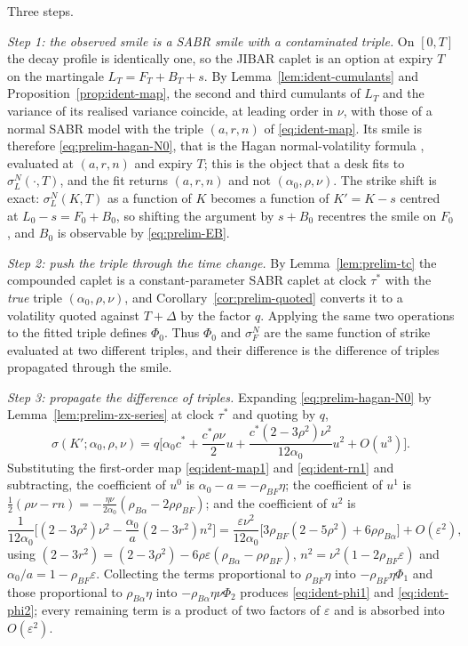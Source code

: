 \documentclass[../../../main.tex]{subfiles}
\begin{document}
\begin{route}
Three steps.

\emph{Step 1: the observed smile is a SABR smile with a contaminated triple.} On $[0,T]$ the decay profile is identically one, so the JIBAR caplet is an option at expiry $T$ on the martingale $L_T=F_T+B_T+s$. By Lemma~\ref{lem:ident-cumulants} and Proposition~\ref{prop:ident-map}, the second and third cumulants of $L_T$ and the variance of its realised variance coincide, at leading order in $\nu$, with those of a normal SABR model with the triple $(a,r,n)$ of \eqref{eq:ident-map}. Its smile is therefore \eqref{eq:prelim-hagan-N0}, that is the Hagan normal-volatility formula \citep[eq.~(A.67a) with $\beta=0$]{hagan2002}, evaluated at $(a,r,n)$ and expiry $T$; this is the object that a desk fits to $\sigma^N_L(\cdot,T)$, and the fit returns $(a,r,n)$ and not $(\alpha_0,\rho,\nu)$. The strike shift is exact: $\sigma^N_L(K,T)$ as a function of $K$ becomes a function of $K'=K-s$ centred at $L_0-s=F_0+B_0$, so shifting the argument by $s+B_0$ recentres the smile on $F_0$, and $B_0$ is observable by \eqref{eq:prelim-EB}.

\emph{Step 2: push the triple through the time change.} By Lemma~\ref{lem:prelim-tc} the compounded caplet is a constant-parameter SABR caplet at clock $\tau^*$ with the \emph{true} triple $(\alpha_0,\rho,\nu)$, and Corollary~\ref{cor:prelim-quoted} converts it to a volatility quoted against $T+\Delta$ by the factor $q$. Applying the same two operations to the fitted triple defines $\Phi_0$. Thus $\Phi_0$ and $\sigma^N_F$ are the same function of strike evaluated at two different triples, and their difference is the difference of triples propagated through the smile.

\emph{Step 3: propagate the difference of triples.} Expanding \eqref{eq:prelim-hagan-N0} by Lemma~\ref{lem:prelim-zx-series} at clock $\tau^*$ and quoting by $q$,
\[
\sigma(K';\alpha_0,\rho,\nu)=q\Big[\alpha_0c^*+\frac{c^*\rho\nu}{2}u+\frac{c^*(2-3\rho^2)\nu^2}{12\alpha_0}u^2+O(u^3)\Big].
\]
Substituting the first-order map \eqref{eq:ident-map1} and \eqref{eq:ident-rn1} and subtracting, the coefficient of $u^0$ is $\alpha_0-a=-\rho_{BF}\eta$; the coefficient of $u^1$ is $\tfrac12(\rho\nu-rn)=-\tfrac{\eta\nu}{2\alpha_0}(\rho_{B\alpha}-2\rho\rho_{BF})$; and the coefficient of $u^2$ is
\[
\frac{1}{12\alpha_0}\Big[(2-3\rho^2)\nu^2-\frac{\alpha_0}{a}(2-3r^2)n^2\Big]
=\frac{\varepsilon\nu^2}{12\alpha_0}\Big[3\rho_{BF}(2-5\rho^2)+6\rho\rho_{B\alpha}\Big]+O(\varepsilon^2),
\]
using $(2-3r^2)=(2-3\rho^2)-6\rho\varepsilon(\rho_{B\alpha}-\rho\rho_{BF})$, $n^2=\nu^2(1-2\rho_{BF}\varepsilon)$ and $\alpha_0/a=1-\rho_{BF}\varepsilon$. Collecting the terms proportional to $\rho_{BF}\eta$ into $-\rho_{BF}\eta\Phi_1$ and those proportional to $\rho_{B\alpha}\eta$ into $-\rho_{B\alpha}\eta\nu\Phi_2$ produces \eqref{eq:ident-phi1} and \eqref{eq:ident-phi2}; every remaining term is a product of two factors of $\varepsilon$ and is absorbed into $O(\varepsilon^2)$.


\end{route}
\end{document}
